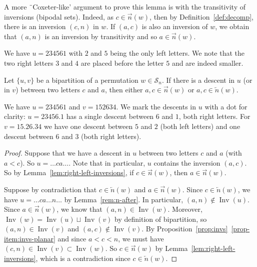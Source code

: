 \documentclass[Unicode]{cedram-alco}
\theoremstyle{definition}
\newcommand{\Sym}[1]{\mathcal{S}_{#1}}
\newcommand{\Symn}{\Sym{n}}
\DeclareMathOperator{\invs}{Inv}
\newcommand{\R}{{\overrightarrow{n}}}
\newcommand{\LL}{{\overleftarrow{n}}}
\begin{document}
\begin{remark} A more ¨Coxeter-like' argument to prove this lemma is with the transitivity of inversions (bipodal sets). Indeed, as $c\in\R(w)$, then by Definition~\ref{def:decomp}, there is an inversion $(c,n)$ in $w$. If $(a,c)$ is also an inversion of $w$, we obtain that $(a,n)$ is an inversion by transitivity and so $a\in\R(w)$.   
\end{remark}

\begin{ex}  We have $u = 234561$ with $2$ and $5$ being the only left letters. We note that the two right letters $3$ and $4$ are placed before the letter $5$ and are indeed smaller.
\end{ex}

\begin{prop}
\label{prop:decents}
Let $\lbrace u, v \rbrace$ be a bipartition of a permutation $w \in \Symn$. If there is a descent in $u$ (or in $v$) between two letters $c$ and $a$, then either $a,c\in\R(w)$ or $a,c\in\LL(w)$.
\end{prop} 

\begin{ex}   We have $u = 234561$ and $v = 152634$. We mark the descents in $u$ with a dot for clarity:  $u = 23456.1$ has a single descent between $6$ and $1$, both right letters. For  $v = 15.26.34$ we have one descent between $5$ and $2$ (both left letters) and one descent between $6$ and $3$ (both right letters).
\end{ex}

\begin{proof} Suppose that we have a descent in $u$ between two letters $c$ and $a$ (with $a < c$). So $u=\dots ca\dots$.  Note that in particular, $u$ contains the inversion $(a,c)$. So by Lemma~\ref{lem:right-left-inversions}, if $c\in\R(w)$, then  $a\in\R(w)$.

Suppose by contradiction that $c\in\LL(w)$  and $a\in\R(w)$. Since $c\in\LL(w)$, we have $u=\dots ca \dots n\dots$ by Lemma~\ref{rem:n-after}. In particular, $(a,n) \not\in \invs(u)$. Since $a\in\R(w)$, we know that $(a,n)\in\invs(w)$. Moreover, $\invs(w) = \invs(u) \sqcup \invs(v)$ by definition of bipartition, so $(a,n) \in \invs(v)$ and $(a,c)\notin\invs(v)$.  By Proposition~\ref{prop:invs}~\eqref{prop-item:invs-planar} and since $a < c < n$, we must have  $(c,n) \in \invs(v) \subset \invs(w)$. So $c\in\R(w)$ by Lemma~\ref{lem:right-left-inversions},   which is a contradiction since $c\in\LL(w)$.
\end{proof}
\end{document}
